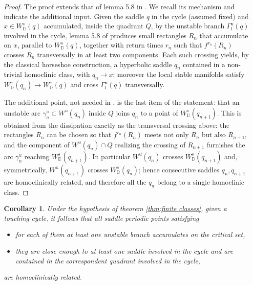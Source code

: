 \documentclass[a4paper,11pt]{article}
\newtheorem{corollary}[lemma]{Corollary}
\theoremstyle{definition}
\def\DD{{\mathbb D}}
\def\ga{\gamma}
\def\Ga{\Gamma}
\def\Ga{\Gamma}
\begin{document}
\begin{proof} The proof extends that of lemma 5.8 in \cite{CPT}. We recall
its mechanism and indicate the additional input. Given the saddle $q$ in the
cycle (assumed fixed) and $x\in W^s_\DD(q)$ accumulated, inside the quadrant
$Q$, by the unstable branch $\Ga^u_l(q)$ involved in the cycle, lemma 5.8 of
\cite{CPT} produces small rectangles $R_n$ that accumulate on $x$,
parallel to $W^s_\DD(q)$, together with return times $r_n$ such that
$f^{r_n}(R_n)$ crosses $R_n$ transversally in at least two components. Each
such crossing yields, by the classical horseshoe construction, a hyperbolic
saddle $q_n$ contained in a non-trivial homoclinic class, with $q_n\to x$;
moreover the local stable manifolds satisfy $W^s_\DD(q_n)\to W^s_\DD(q)$ and
cross $\Ga^u_l(q)$ transversally.

The additional point, not needed in \cite{CPT}, is the last item of the
statement: that an unstable arc $\ga^u_n\subset W^u(q_n)$ inside $Q$ joins
$q_n$ to a point of $W^s_\DD(q_{n+1})$. This is obtained from the dissipation
exactly as the transversal crossing above: the rectangles $R_n$ can be
chosen so that $f^{r_n}(R_n)$ meets not only $R_n$ but also $R_{n+1}$, and
the component of $W^u(q_n)\cap Q$ realizing the crossing of $R_{n+1}$
furnishes the arc $\ga^u_n$ reaching $W^s_\DD(q_{n+1})$. In particular
$W^u(q_n)$ crosses $W^s_\DD(q_{n+1})$ and, symmetrically, $W^u(q_{n+1})$
crosses $W^s_\DD(q_n)$; hence consecutive saddles $q_n,q_{n+1}$ are
homoclinically related, and therefore all the $q_n$ belong to a single
homoclinic class.

\end{proof}


\begin{corollary}\label{touching} Under the hypothesis of theorem \ref{thm:finite classes}, given a touching cycle, it follows that  all saddle periodic points satisfying 

\begin{itemize}
    \item[--]  for  each of them  at least one unstable branch accumulates on the critical set,
    \item[--] they are close enough to at least one saddle involved in the  cycle and  are  contained in the correspondent quadrant involved in the cycle,
\end{itemize}
are homoclinically related.
    
\end{corollary}
\end{document}
